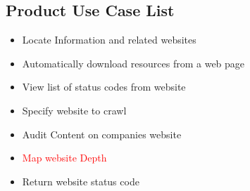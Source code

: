 \documentclass[titlepage]{article}
\begin{document}
\subsection*{Product Use Case List  }
\begin{itemize}
  \item Locate Information and related websites
  \item Automatically download resources from a web page
  \item View list of status codes from website 
  \item Specify website to crawl
  \item Audit Content on companies website 
  \item \textcolor{red}{Map website Depth}
  \item Return website status code
\end{itemize}
\end{document}
